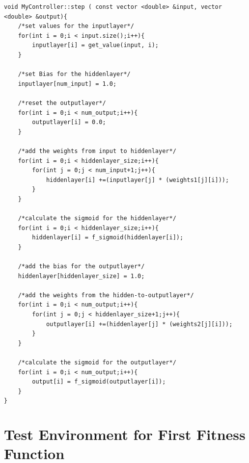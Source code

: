 \begin{lstlisting}[caption = GA Assisted Artificial Neural Network Step function]
void MyController::step ( const vector <double> &input, vector <double> &output){
    /*set values for the inputlayer*/
    for(int i = 0;i < input.size();i++){
        inputlayer[i] = get_value(input, i);
    }

    /*set Bias for the hiddenlayer*/
    inputlayer[num_input] = 1.0;

    /*reset the outputlayer*/
    for(int i = 0;i < num_output;i++){
        outputlayer[i] = 0.0;
    }

    /*add the weights from input to hiddenlayer*/
    for(int i = 0;i < hiddenlayer_size;i++){
        for(int j = 0;j < num_input+1;j++){
            hiddenlayer[i] +=(inputlayer[j] * (weights1[j][i]));
        }
    }

    /*calculate the sigmoid for the hiddenlayer*/
    for(int i = 0;i < hiddenlayer_size;i++){
        hiddenlayer[i] = f_sigmoid(hiddenlayer[i]);
    }

    /*add the bias for the outputlayer*/
    hiddenlayer[hiddenlayer_size] = 1.0;

    /*add the weights from the hidden-to-outputlayer*/
    for(int i = 0;i < num_output;i++){
        for(int j = 0;j < hiddenlayer_size+1;j++){
            outputlayer[i] +=(hiddenlayer[j] * (weights2[j][i]));
        }
    }

    /*calculate the sigmoid for the outputlayer*/
    for(int i = 0;i < num_output;i++){
        output[i] = f_sigmoid(outputlayer[i]);
    }
}
\end{lstlisting}
\newpage
\section{Test Environment for First Fitness Function}

